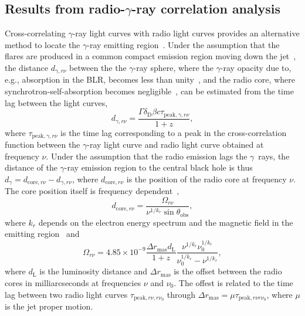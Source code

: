 \documentclass[twocolumn,linenumbers]{aastex62}
\newcommand{\Grays}{$\gamma$~rays\xspace}
\newcommand{\gray}{$\gamma$-ray\xspace}
\begin{document}
\subsection{Results from radio-\gray correlation analysis}
\label{sec:gammaradio}

Cross-correlating \gray light curves with radio light curves provides an alternative method to locate the \gray emitting region~\citep[e.g.,][]{2014MNRAS.441.1899F}.
Under the assumption that the flares are produced in a common compact emission  region moving down the jet~\citep[e.g.,][]{2014MNRAS.445..428M},
the distance $d_{\gamma,r\nu}$ between the 
the \gray sphere, where the \gray opacity due to, e.g., absorption in the BLR, becomes less than unity~\citep{1995ApJ...441...79B}, and the 
radio core, where synchrotron-self-absorption becomes negligible~\citep[][]{1981ApJ...243..700K}, 
can be estimated from the time lag between the light curves, 
\begin{equation}
    d_{\gamma,r\nu} = \frac{\Gamma\delta_\mathrm{D}\beta c\tau_{\mathrm{peak},\gamma,r\nu}}{1 + z},
    \label{eq:dgamma-r}
\end{equation}
where $\tau_{\mathrm{peak},\gamma,r\nu}$ is the time lag corresponding to a peak in the cross-correlation function between the \gray light curve and radio light curve obtained at frequency $\nu$.
Under the assumption that the radio emission lags the \Grays, the distance of the \gray emission region to the central black hole is thus $d_\gamma = d_{\mathrm{core},r\nu} - d_{\gamma,r\nu}$, where $d_{\mathrm{core},r\nu}$ is the position of the radio core at frequency $\nu$.
The core position itself is frequency dependent~\citep[the core shift effect, see, e.g.,][]{1998A&A...330...79L},
\begin{equation}
    d_{\mathrm{core},r\nu} = \frac{\Omega_{r\nu}}{\nu^{1/k_r}\sin\theta_\mathrm{obs}},
     \label{eq:core-shift1}
\end{equation}
where $k_r$ depends on the electron energy spectrum and the magnetic field in the emitting region~\citep{1981ApJ...243..700K} and
\begin{equation}
    \Omega_{r\nu} = 4.85\times10^{-9} \frac{\Delta r_\mathrm{mas} d_\mathrm{L}}{1 + z}\frac{\nu^{1/k_r}\nu_0^{1/k_r}}{\nu_0^{1/k_r}-\nu^{1/k_r}},
    \label{eq:core-shift2}
\end{equation}
where $d_\mathrm{L}$ is the luminosity distance and $\Delta r_\mathrm{mas}$ is the offset between the radio cores in milliarcseconds at frequencies $\nu$ and $\nu_0$. 
The offest is related to the time lag between two radio light curves $\tau_{\mathrm{peak},r\nu,r\nu_0}$ through 
$\Delta r_\mathrm{mas} = \mu \tau_{\mathrm{peak},r\nu r\nu_0}$, where $\mu$ is the jet proper motion. 
\end{document}
